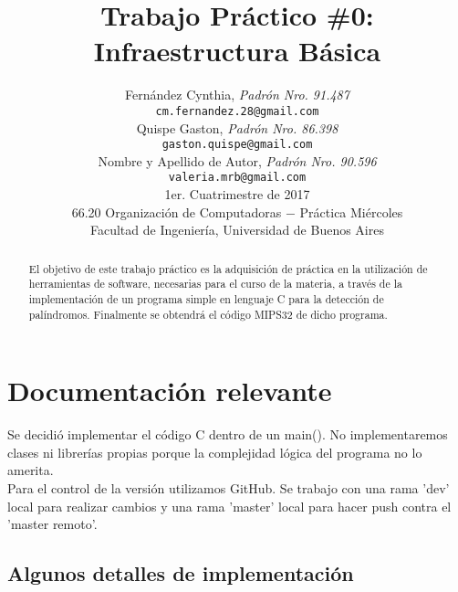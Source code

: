 \documentclass[a4paper,10pt]{article}
\title{	\textbf{Trabajo Pr\'actico \#0: Infraestructura B\'asica}}
\author{
	Fern\'andez Cynthia, \textit{Padr\'on Nro. 91.487}               \\
	\texttt{ cm.fernandez.28@gmail.com }                             \\[2.5ex]
	Quispe Gaston, \textit{Padr\'on Nro. 86.398}                     \\
	\texttt{ gaston.quispe@gmail.com }                               \\[2.5ex]
	Nombre y Apellido de Autor, \textit{Padr\'on Nro. 90.596}        \\
	\texttt{ valeria.mrb@gmail.com }                                 \\[2.5ex]
	\normalsize{1er. Cuatrimestre de 2017}                           \\
	\normalsize{66.20 Organizaci\'on de Computadoras  $-$ Pr\'actica Mi\'ercoles} \\
	\normalsize{Facultad de Ingenier\'ia, Universidad de Buenos Aires}            \\
       }
\date{}
\begin{document}
\maketitle


\thispagestyle{empty}   %


\begin{abstract}
El objetivo de este trabajo pr\'actico es la adquisici\'on de
pr\'actica en la utilizaci\'on de herramientas de software, necesarias
para el curso de la materia, a trav\'es de la implementaci\'on de un
programa simple en lenguaje C para la detecci\'on de pal\'indromos.
Finalmente se obtendr\'a el c\'odigo MIPS32 de dicho programa.
\end{abstract}

\tableofcontents

\section{Documentaci\'on relevante}

Se decidi\'o implementar el c\'odigo C dentro de un main(). No
implementaremos clases ni librer\'ias propias porque la complejidad
l\'ogica del programa no lo amerita.\\
Para el control de la versi\'on utilizamos GitHub. Se trabajo con una
rama 'dev' local para realizar cambios y una rama 'master' local
para hacer push contra el 'master remoto'.\\

\subsection{Algunos detalles de implementaci\'on}
\end{document}
